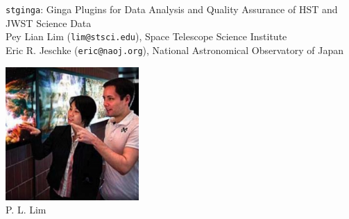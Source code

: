\documentclass[]{article}
\begin{document}
\begin{minipage}[t]{0.8\linewidth}
  \vspace{0pt}
\begin{center}
{\huge {\tt stginga}: Ginga Plugins for Data Analysis and Quality Assurance of
            HST and JWST Science Data }\\

\vspace*{1.5em}
Pey Lian Lim ({\tt lim@stsci.edu}),
Space Telescope Science Institute \\
Eric R. Jeschke ({\tt eric@naoj.org}),
National Astronomical Observatory of Japan
\end{center}
\end{minipage}
\hfill
\begin{minipage}[t]{0.15\linewidth}
  \vspace{0pt}
  \includegraphics[width=2in]{pllim} \\
  {P. L. Lim}
\end{minipage}
\vspace*{2em}

\noindent\hrulefill

\raggedcolumns
\setlength{\columnseprule}{1pt}
\setlength{\columnsep}{2em}
\end{document}
